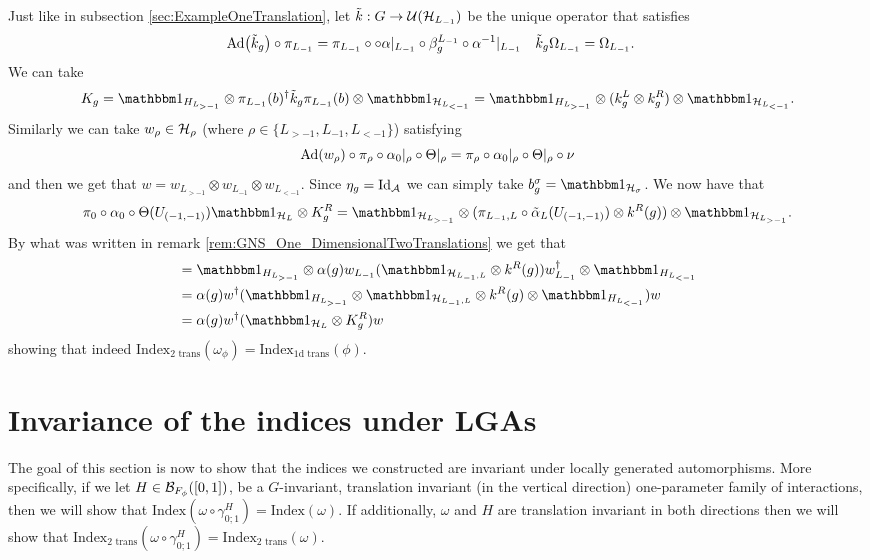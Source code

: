 \documentclass[11pt,a4paper,twoside]{article}
\numberwithin{equation}{section}
\begin{document}
	Just like in subsection \ref{sec:ExampleOneTranslation}, let $\tilde k:G\rightarrow \UU(\HH_{L_{-1}})$ be the unique operator that satisfies
	\begin{align}
		\Ad{\tilde{k}_g}\circ\pi_{L_{-1}}&=\pi_{L_{-1}}\circ \circ\alpha|_{L_{-1}}\circ\beta_g^{L_{-1}}\circ \alpha^{-1}|_{L_{-1}}&\tilde k_g\Omega_{L_{-1}}&=\Omega_{L_{-1}}.
	\end{align}
	We can take
	\begin{equation}
		K_g=\id_{H_{L_{>-1}}}\otimes \pi_{L_{-1}}(b)^\dagger \tilde k_g \pi_{L_{-1}}(b) \otimes\id_{\HH_{L_{<-1}}} =\id_{H_{L_{>-1}}}\otimes (k_g^L\otimes k_g^R) \otimes\id_{\HH_{L_{<-1}}}.
	\end{equation}
	Similarly we can take $w_\rho\in\HH_\rho$ (where $\rho\in\{L_{>-1},L_{-1},L_{<-1}\}$) satisfying
	\begin{equation}
		\Ad{w_\rho}\circ\pi_\rho\circ\alpha_{0}|_\rho\circ\Theta|_\rho=\pi_\rho\circ\alpha_{0}|_\rho\circ\Theta|_\rho\circ\nu
	\end{equation}
	and then we get that $w=w_{L_{>-1}}\otimes w_{L_{-1}}\otimes w_{L_{<-1}}$. Since $\eta_g=\textrm{Id}_{\AA}$ we can simply take $b_g^\sigma=\id_{\HH_\sigma}$. We now have that
	\begin{equation}
		\pi_0\circ\alpha_0\circ\Theta(U_{(-1,-1)})\id_{\HH_L}\otimes K_g^R=\id_{\HH_{L_{>-1}}}\otimes(\pi_{L_{-1},L}\circ\tilde\alpha_L(U_{(-1,-1)})\otimes k^R(g))\otimes\id_{\HH_{L_{>-1}}}.
	\end{equation}
	By what was written in remark \ref{rem:GNS_One_DimensionalTwoTranslations} we get that
	\begin{align}
		&=\id_{H_{L_{>-1}}}\otimes\alpha(g) w_{L_{-1}}(\id_{\HH_{L_{-1},L}}\otimes k^R(g))w_{L_{-1}}^\dagger\otimes \id_{H_{L_{<-1}}}\\
		&=\alpha(g)w^\dagger (\id_{H_{L_{>-1}}}\otimes \id_{\HH_{L_{-1},L}}\otimes k^R(g)\otimes \id_{H_{L_{<-1}}}) w\\
		&=\alpha(g)w^\dagger (\id_{\HH_L}\otimes K^R_g) w
	\end{align}
	showing that indeed $\textrm{Index}_{\text{2 trans}}(\omega_\phi)=\textrm{Index}_{\text{1d trans}}(\phi)$.
	\section{Invariance of the indices under LGAs}\label{sec:AllIndicesInvariantUnderLGA}
	The goal of this section is now to show that the indices we constructed are invariant under locally generated automorphisms. More specifically, if we let $H\in\BB_{F_\phi}([0,1])$, be a $G$-invariant, translation invariant (in the vertical direction) one-parameter family of interactions, then we will show that $\textrm{Index}(\omega\circ\gamma^H_{0;1})=\textrm{Index}(\omega)$. If additionally, $\omega$ and $H$ are translation invariant in both directions then we will show that $\textrm{Index}_{\text{2 trans}}(\omega\circ\gamma^H_{0;1})=\textrm{Index}_{\text{2 trans}}(\omega)$.
\end{document}
